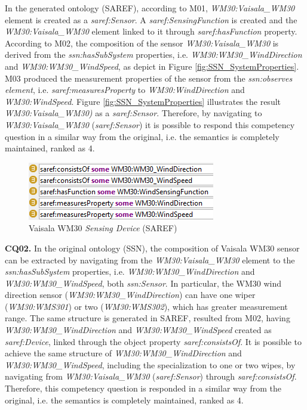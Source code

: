 \documentclass{sig-alternate-05-2015}
\begin{document}
In the generated ontology (SAREF), according to M01, \textit{WM30:Vaisala\_WM30} element is created as a \textit{saref:Sensor}. A \textit{saref:SensingFunction} is created and the \textit{WM30:Vaisala\_WM30} element linked to it through \textit{saref:hasFunction} property. According to M02, the composition of the sensor \textit{WM30:Vaisala\_WM30} is derived from the \textit{ssn:hasSubSystem} properties, i.e. \textit{WM30:WM30\_WindDirection} and \textit{WM30:WM30\_WindSpeed}, as depict in Figure \ref{fig:SSN_SystemProperties}. M03 produced the measurement properties of the sensor from the \textit{ssn:observes element}, i.e. \textit{saref:measuresProperty} to \textit{WM30:WindDirection} and \textit{WM30:WindSpeed}. Figure \ref{fig:SSN_SystemProperties} illustrates the result \textit{WM30:Vaisala\_WM30)} as a \textit{saref:Sensor}. Therefore, by navigating to \textit{WM30:Vaisala_WM30} (\textit{saref:Sensor}) it is possible to respond this competency question in a similar way from the original, i.e. the semantics is completely maintained, ranked as 4.  

\begin{figure}[h!]
\centering
\includegraphics[scale=0.98]{SAREF_Sensor_WM30}
\caption{Vaisala WM30 \textit{Sensing Device} (SAREF)}
\label{fig:SAREF_Sensor_WM30}
\end{figure}

\textbf{CQ02.} In the original ontology (SSN), the composition of Vaisala WM30 sensor can be extracted by navigating from the \textit{WM30:Vaisala\_WM30} element to the \textit{ssn:hasSubSystem} properties, i.e. \textit{WM30:WM30\_WindDirection} and \textit{WM30:WM30\_WindSpeed}, both \textit{ssn:Sensor}. In particular, the WM30 wind direction sensor (\textit{WM30:WM30\_WindDirection}) can have one wiper (\textit{WM30:WMS301}) or two (\textit{WM30:WMS302}), which has greater measurement range. The same structure is generated in SAREF, resulted from M02, having \textit{WM30:WM30\_WindDirection} and \textit{WM30:WM30\_WindSpeed} created as \textit{saref:Device}, linked through the object property \textit{saref:consistsOf}. It is possible to achieve the same structure of \textit{WM30:WM30\_WindDirection} and \textit{WM30:WM30\_WindSpeed}, including the specialization to one or two wipes, by navigating from \textit{WM30:Vaisala\_WM30} (\textit{saref:Sensor}) through \textit{saref:consistsOf}. Therefore, this competency question is responded in a similar way from the original, i.e. the semantics is completely maintained, ranked as 4.
\end{document}
